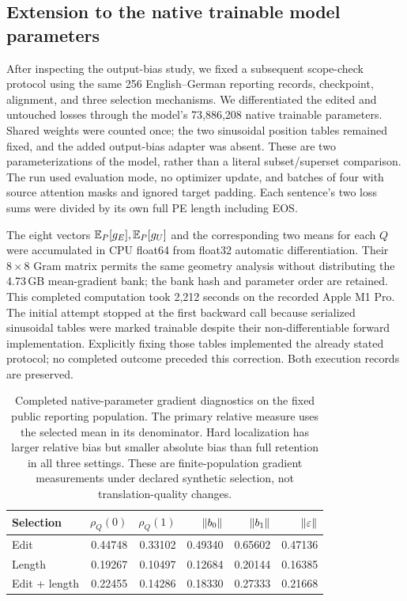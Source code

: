 \subsection{Extension to the native trainable model parameters}
\label{sec:nativeparameters}
After inspecting the output-bias study, we fixed a subsequent scope-check protocol using the same 256 English--German reporting records, checkpoint, alignment, and three selection mechanisms. We differentiated the edited and untouched losses through the model's 73,886,208 native trainable parameters. Shared weights were counted once; the two sinusoidal position tables remained fixed, and the added output-bias adapter was absent. These are two parameterizations of the model, rather than a literal subset/superset comparison. The run used evaluation mode, no optimizer update, and batches of four with source attention masks and ignored target padding. Each sentence's two loss sums were divided by its own full PE length including EOS.

The eight vectors $\mathbb{E}_P[g_E],\mathbb{E}_P[g_U]$ and the corresponding two means for each $Q$ were accumulated in CPU float64 from float32 automatic differentiation. Their $8\times8$ Gram matrix permits the same geometry analysis without distributing the 4.73\,GB mean-gradient bank; the bank hash and parameter order are retained. This completed computation took 2,212 seconds on the recorded Apple M1 Pro. The initial attempt stopped at the first backward call because serialized sinusoidal tables were marked trainable despite their non-differentiable forward implementation. Explicitly fixing those tables implemented the already stated protocol; no completed outcome preceded this correction. Both execution records are preserved.

\begin{table}[ht]
\centering\small
\setlength{\tabcolsep}{5pt}
\begin{tabular}{lrrrrr}
\toprule
Selection & $\rho_Q(0)$ & $\rho_Q(1)$ & $\lVert b_0\rVert$ & $\lVert b_1\rVert$ & $\lVert \varepsilon\rVert$ \\
\midrule
Edit & 0.44748 & 0.33102 & 0.49340 & 0.65602 & 0.47136 \\
Length & 0.19267 & 0.10497 & 0.12684 & 0.20144 & 0.16385 \\
Edit + length & 0.22455 & 0.14286 & 0.18330 & 0.27333 & 0.21668 \\
\bottomrule
\end{tabular}
\caption{Completed native-parameter gradient diagnostics on the fixed public reporting population. The primary relative measure uses the selected mean in its denominator. Hard localization has larger relative bias but smaller absolute bias than full retention in all three settings. These are finite-population gradient measurements under declared synthetic selection, not translation-quality changes.}
\label{tab:nativeparameters}
\end{table}

